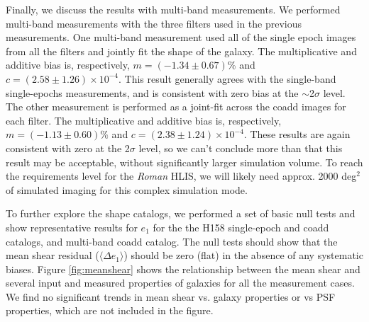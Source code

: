 \documentclass[fleqn,usenatbib]{mnras}
\begin{document}
Finally, we discuss the results with multi-band measurements. We performed multi-band measurements with the three filters used in the previous measurements. One multi-band measurement used all of the single epoch images from all the filters and jointly fit the shape of the galaxy. The multiplicative and additive bias is, respectively, $m=(-1.34\pm0.67)$\% and $c=(2.58\pm1.26)\times10^{-4}$. This result generally agrees with the single-band single-epochs measurements, and is consistent with zero bias at the $\sim$2$\sigma$ level. The other measurement is performed as a joint-fit across the coadd images for each filter. The multiplicative and additive bias is, respectively, $m=(-1.13\pm0.60)\%$ and $c=(2.38\pm1.24)\times10^{-4}$. These results are again consistent with zero at the 2$\sigma$ level, so we can't conclude more than that this result may be acceptable, without significantly larger simulation volume. To reach the requirements level for the \emph{Roman} HLIS, we will likely need approx. 2000 deg$^{2}$ of simulated imaging for this complex simulation mode. 

To further explore the shape catalogs, we performed a set of basic null tests and show representative results for $e_1$ for the the H158 single-epoch and coadd catalogs, and multi-band coadd catalog. The null tests should show that the mean shear residual ($\langle \Delta e_{1} \rangle$) should be zero (flat) in the absence of any systematic biases. Figure \ref{fig:meanshear} shows the relationship between the mean shear and several input and measured properties of galaxies for all the measurement cases. We find no significant trends in mean shear vs. galaxy properties or vs PSF properties, which are not included in the figure. 
\end{document}
